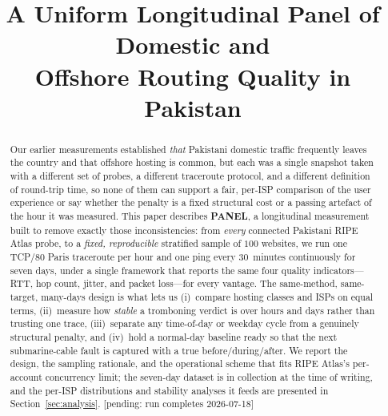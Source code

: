 \documentclass[conference]{IEEEtran}
\newcommand{\pending}{{\color{gray}\small[pending: run completes 2026-07-18]}}
\begin{document}
\title{A Uniform Longitudinal Panel of Domestic and\\
Offshore Routing Quality in Pakistan}

\author{
}

\maketitle

\begin{abstract}
Our earlier measurements established \emph{that} Pakistani domestic traffic frequently leaves the
country and that offshore hosting is common, but each was a single snapshot taken with a different
set of probes, a different traceroute protocol, and a different definition of round-trip time, so
none of them can support a fair, per-ISP comparison of the user experience or say whether the
penalty is a fixed structural cost or a passing artefact of the hour it was measured. This paper
describes \textbf{PANEL}, a longitudinal measurement built to remove exactly those inconsistencies:
from \emph{every} connected Pakistani RIPE Atlas probe, to a \emph{fixed, reproducible} stratified
sample of $100$ websites, we run one TCP/80 Paris traceroute per hour and one ping every
$30$~minutes continuously for seven days, under a single framework that reports the same four
quality indicators---RTT, hop count, jitter, and packet loss---for every vantage. The same-method,
same-target, many-days design is what lets us (i)~compare hosting classes and ISPs on equal terms,
(ii)~measure how \emph{stable} a tromboning verdict is over hours and days rather than trusting one
trace, (iii)~separate any time-of-day or weekday cycle from a genuinely structural penalty, and
(iv)~hold a normal-day baseline ready so that the next submarine-cable fault is captured with a
true before/during/after. We report the design, the sampling rationale, and the operational
scheme that fits RIPE Atlas's per-account concurrency limit; the seven-day dataset is in
collection at the time of writing, and the per-ISP distributions and stability analyses it feeds
are presented in Section~\ref{sec:analysis}. \pending
\end{abstract}
\end{document}

